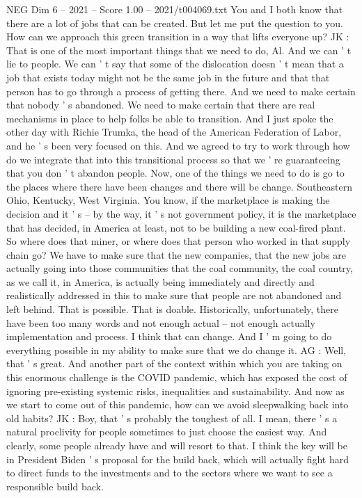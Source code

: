 \begin{textsample}{NEG Dim 6 – 2021 – Score 1.00 – 2021/t004069.txt}
You and I both know that there are a lot of jobs that can be created.
But let me put the question to you.
How can we approach this green transition in a way that lifts everyone up?
JK : That is one of the most important things that we need to do, Al.
And we can ' t lie to people.
We can ' t say that some of the dislocation doesn ' t mean that a job that exists today might not be the same job in the future and that that person has to go through a process of getting there.
And we need to make certain that nobody ' s abandoned.
We need to make certain that there are real mechanisms in place to help folks be able to transition.
And I just spoke the other day with Richie Trumka, the head of the American Federation of Labor, and he ' s been very focused on this.
And we agreed to try to work through how do we integrate that into this transitional process so that we ' re guaranteeing that you don ' t abandon people.
Now, one of the things we need to do is go to the places where there have been changes and there will be change.
Southeastern Ohio, Kentucky, West Virginia.
You know, if the marketplace is making the decision and it ' s -- by the way, it ' s not government policy, it is the marketplace that has decided, in America at least, not to be building a new coal-fired plant.
So where does that miner, or where does that person who worked in that supply chain go?
We have to make sure that the new companies, that the new jobs are actually going into those communities that the coal community, the coal country, as we call it, in America, is actually being immediately and directly and realistically addressed in this to make sure that people are not abandoned and left behind.
That is possible.
That is doable.
Historically, unfortunately, there have been too many words and not enough actual -- not enough actually implementation and process.
I think that can change.
And I ' m going to do everything possible in my ability to make sure that we do change it.
AG : Well, that ' s great.
And another part of the context within which you are taking on this enormous challenge is the COVID pandemic, which has exposed the cost of ignoring pre-existing systemic risks, inequalities and sustainability.
And now as we start to come out of this pandemic, how can we avoid sleepwalking back into old habits?
JK : Boy, that ' s probably the toughest of all.
I mean, there ' s a natural proclivity for people sometimes to just choose the easiest way.
And clearly, some people already have and will resort to that.
I think the key will be in President Biden ' s proposal for the build back, which will actually fight hard to direct funds to the investments and to the sectors where we want to see a responsible build back.

\end{textsample}
